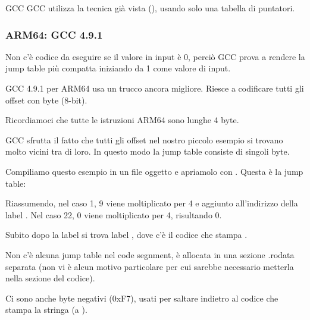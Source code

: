 GCC 
GCC utilizza la tecnica già vista (), usando solo una tabella di puntatori.

\subsubsection{ARM64: \Optimizing GCC 4.9.1}

Non c'è codice da eseguire se il valore in input è 0, perciò GCC prova a rendere la jump table più compatta iniziando da 1 come valore di input.

GCC 4.9.1 per ARM64 usa un trucco ancora migliore.
Riesce a codificare tutti gli offset con byte (8-bit).

Ricordiamoci che tutte le istruzioni ARM64 sono lunghe 4 byte.

GCC sfrutta il fatto che tutti gli offset nel nostro piccolo esempio si trovano molto vicini tra di loro.
In questo modo la jump table consiste di singoli byte.



Compiliamo questo esempio in un file oggetto e apriamolo con \IDA. Questa è la jump table:



Riassumendo, nel caso 1, 9 viene moltiplicato per 4 e aggiunto all'indirizzo della label .
Nel caso 22, 0 viene moltiplicato per 4, risultando 0. 

Subito dopo la label  si trova label , dove c'è il codice che stampa .

Non c'è alcuna jump table nel code segnment, è allocata in una sezione .rodata separata (non vi è alcun motivo particolare
per cui sarebbe necessario metterla nella sezione del codice).

Ci sono anche byte negativi (0xF7), usati per saltare indietro al codice che stampa la stringa  (a ).

